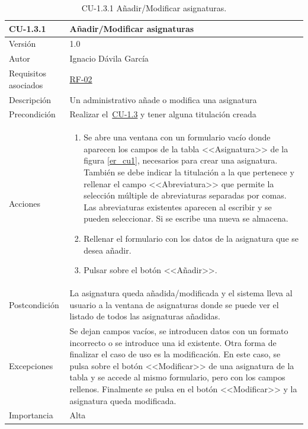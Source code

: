\begin{table}[p]
	\centering
	\begin{tabularx}{\linewidth}{ p{} p{} }
		\toprule
		\textbf{CU-1.3.1}    & \textbf{Añadir/Modificar asignaturas}\\
		\toprule
		{\small Versión}              & 1.0    \\
		{\small Autor}                & Ignacio Dávila García \\
		{\small Requisitos asociados} & \hyperref[itm:RF2]{RF-02} \\
		{\small Descripción}          & Un administrativo añade o modifica una asignatura \\
		{\small Precondición}         & Realizar el~\hyperref[table:CU-1_3]{CU-1.3} y tener alguna titulación creada \\
		{\small Acciones}             &
		\begin{enumerate}
			\def\labelenumi{\arabic{enumi}.}
			\tightlist
			\item Se abre una ventana con un formulario vacío donde aparecen los campos de la tabla <<Asignatura>> de la figura \ref{er_cu1}, necesarios para crear una asignatura. También se debe indicar la titulación a la que pertenece y rellenar el campo <<Abreviatura>> que permite la selección múltiple de abreviaturas separadas por comas. Las abreviaturas existentes aparecen al escribir y se pueden seleccionar. Si se escribe una nueva se almacena.
			\item Rellenar el formulario con los datos de la asignatura que se desea añadir.
			\item Pulsar sobre el botón <<Añadir>>.
		\end{enumerate}\\
		{\small Postcondición}        & La asignatura queda añadida/modificada y el sistema lleva al usuario a la ventana de asignaturas donde se puede ver el listado de todos las asignaturas añadidas. \\
		{\small Excepciones}          & Se dejan campos vacíos, se introducen datos con un formato incorrecto o se introduce una id existente. Otra forma de finalizar el caso de uso es la modificación. En este caso, se pulsa sobre el botón <<Modificar>> de una asignatura de la tabla y se accede al mismo formulario, pero con los campos rellenos. Finalmente se pulsa en el botón <<Modificar>> y la asignatura queda modificada. \\
		{\small Importancia}          & Alta \\
		\bottomrule
	\end{tabularx}
	\caption{CU-1.3.1 Añadir/Modificar asignaturas.}\label{table:CU-1_3_1}
\end{table}
\FloatBarrier


